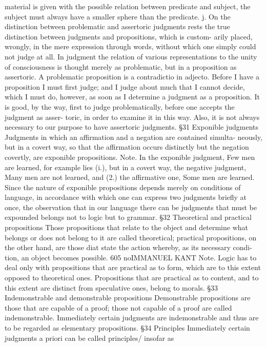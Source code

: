 material is given with the possible relation between predicate and subject,
the subject must always have a smaller sphere than the predicate.
j. On the distinction between problematic and assertoric judgments rests
the true distinction between judgments and propositions, which is custom-
arily placed, wrongly, in the mere expression through words, without
which one simply could not judge at all. In judgment the relation of
various representations to the unity of consciousness is thought merely as
problematic, but in a proposition as assertoric. A problematic proposition
is a contradictio in adjecto. Before I have a proposition I must first judge;
and I judge about much that I cannot decide, which I must do, however,
as soon as I determine a judgment as a proposition. It is good, by the way,
first to judge problematically, before one accepts the judgment as asser-
toric, in order to examine it in this way. Also, it is not always necessary to
our purpose to have assertoric judgments.
§31
Exponible judgments
Judgments in which an affirmation and a negation are contained simulta-
neously, but in a covert way, so that the affirmation occurs distinctly but
the negation covertly, are exponible propositions.
Note.
In the exponible judgment, Few men are learned, for example lies (i.), but
in a covert way, the negative judgment, Many men are not learned, and (2.)
the affirmative one, Some men are learned. Since the nature of exponible
propositions depends merely on conditions of language, in accordance
with which one can express two judgments briefly at once, the observation
that in our language there can be judgments that must be expounded
belongs not to logic but to grammar.
§32
Theoretical and practical propositions
Those propositions that relate to the object and determine what belongs
or does not belong to it are called theoretical; practical propositions, on the
other hand, are those diat state the action whereby, as its necessary condi-
tion, an object becomes possible.
605
noIMMANUEL KANT
Note.
Logic has to deal only with propositions that are practical as to form, which
are to this extent opposed to theoretical ones. Propositions that are practical
as to content, and to this extent are distinct from speculative ones, belong to
morals.
§33
Indemonstrable and demonstrable propositions
Demonstrable propositions are those that are capable of a proof; those not
capable of a proof are called indemonstrable.
Immediately certain judgments are indemonstrable and thus are to be
regarded as elementary propositions.
§34
Principles
Immediately certain judgments a priori can be called principles/ insofar as
